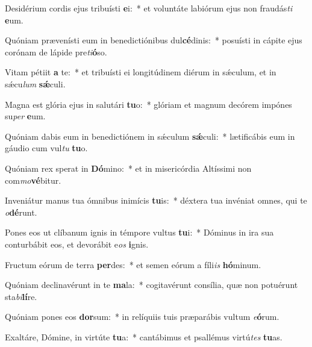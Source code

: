 \item Desidérium cordis ejus tribuísti \textbf{e}i:~* et voluntáte labiórum ejus non fraudás\textit{ti} \textbf{e}um.
\item Quóniam prævenísti eum in benedictiónibus dul\textbf{cé}dinis:~* posuísti in cápite ejus corónam de lápide pre\textit{ti}\textbf{ó}so.
\item Vitam pétiit \textbf{a} te:~* et tribuísti ei longitúdinem diérum in sǽculum, et in sǽcu\textit{lum} \textbf{sǽ}culi.
\item Magna est glória ejus in salutári \textbf{tu}o:~* glóriam et magnum decórem impónes su\textit{per} \textbf{e}um.
\item Quóniam dabis eum in benedictiónem in sǽculum \textbf{sǽ}culi:~* lætificábis eum in gáudio cum vul\textit{tu} \textbf{tu}o.
\item Quóniam rex sperat in \textbf{Dó}mino:~* et in misericórdia Altíssimi non com\textit{mo}\textbf{vé}bitur.
\item Inveniátur manus tua ómnibus inimícis \textbf{tu}is:~* déxtera tua invéniat omnes, qui te \textit{o}\textbf{dé}runt.
\item Pones eos ut clíbanum ignis in témpore vultus \textbf{tu}i:~* Dóminus in ira sua conturbábit eos, et devorábit e\textit{os} \textbf{i}gnis.
\item Fructum eórum de terra \textbf{per}des:~* et semen eórum a fíli\textit{is} \textbf{hó}minum.
\item Quóniam declinavérunt in te \textbf{ma}la:~* cogitavérunt consília, quæ non potuérunt sta\textit{bi}\textbf{lí}re.
\item Quóniam pones eos \textbf{dor}sum:~* in relíquiis tuis præparábis vultum \textit{e}\textbf{ó}rum.
\item Exaltáre, Dómine, in virtúte \textbf{tu}a:~* cantábimus et psallémus virtú\textit{tes} \textbf{tu}as.
